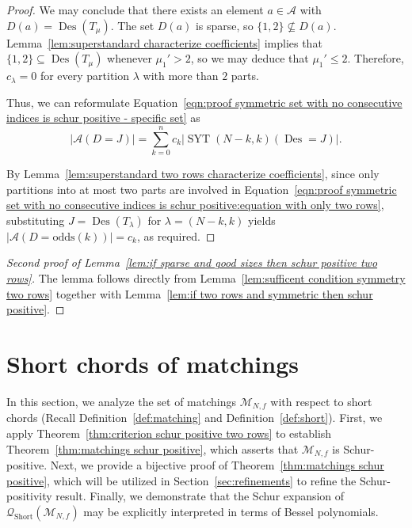 \documentclass[ALCO]{cedram}
\newcommand{\Des}{\operatorname{Des}}
\newcommand{\Syt}{\operatorname{SYT}}
\newcommand{\Short}{\operatorname{Short}}
\newcommand{\Q}{\mathcal{Q}}
\newcommand{\A}{\mathcal{A}}
\newcommand{\M}{\mathcal{M}}
\newcommand{\odds}{\mathrm{odds}}
\begin{document}
\begin{proof}
    We may conclude that there exists an element $a \in \A$ with $D(a) = \Des(T_\mu)$. The set $D(a)$ is sparse, so $\{1,2\} \nsubseteq D(a)$. Lemma~\ref{lem:superstandard characterize coefficients} implies that $\{1,2\} \subseteq \Des(T_\mu)$ whenever $\mu_1' >2$, so we may deduce that $\mu_1' \le 2$. Therefore, $c_\lambda = 0$ for every partition $\lambda$ with more than $2$ parts.
    
    Thus, we can reformulate Equation~\eqref{eqn:proof symmetric set with no consecutive indices is schur positive - specific set} as
    \begin{equation}\label{eqn:proof symmetric set with no consecutive indices is schur positive:equation with only two rows}
        |\A(D = J)| = \sum_{k=0}^n c_k \left|\Syt(N-k,k)(\Des = J)\right|.
    \end{equation}
    
    By Lemma~\ref{lem:superstandard two rows characterize coefficients}, since only partitions into at most two parts are involved in Equation~\eqref{eqn:proof symmetric set with no consecutive indices is schur positive:equation with only two rows}, substituting $J = \Des(T_{\lambda})$ for $\lambda = (N-k,k)$ yields $|\A(D = \odds(k))| = c_k$, as required.
\end{proof}

\begin{proof}[Second proof of Lemma~\ref{lem:if sparse and good sizes then schur positive two rows}]
    The lemma follows directly from Lemma~\ref{lem:sufficent condition symmetry two rows} together with Lemma~\ref{lem:if two rows and symmetric then schur positive}.
\end{proof}

\section{Short chords of matchings}
\label{sec:short chords in matchings}



In this section, we analyze the set of matchings $\M_{N,f}$ with respect to short chords (Recall Definition~\ref{def:matching} and Definition~\ref{def:short}). First, we apply Theorem~\ref{thm:criterion schur positive two rows} to establish Theorem~\ref{thm:matchings schur positive}, which asserts that $\M_{N,f}$ is Schur-positive. Next, we provide a bijective proof of Theorem~\ref{thm:matchings schur positive}, which will be utilized in Section~\ref{sec:refinements} to refine the Schur-positivity result. Finally, we demonstrate that the Schur expansion of $\Q_{\Short} (\M_{N,f})$ may be explicitly interpreted in terms of Bessel polynomials.
\end{document}
